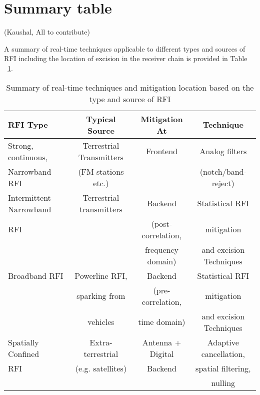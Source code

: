 \section{Summary table} (Kaushal, All to contribute)
\label{section:hardware:summary}

A summary of real-time techniques applicable to different types and sources of RFI including the location of excision in the receiver chain is provided in Table ~\ref{real-time-tech}. \\




\begin{table}
  \begin{center}
  \caption{Summary of real-time techniques and mitigation location based on the type and source of RFI}
  \label{real-time-tech}
 {\scriptsize
  \begin{tabular}{|l|c|c|c|}\hline 
{\bf RFI Type} & {\bf Typical Source} & {\bf Mitigation At} & {\bf Technique} \\ 
    \hline
Strong, continuous,
 & Terrestrial Transmitters & Frontend  & Analog filters\\
  Narrowband RFI  & (FM stations etc.) &  & (notch/band-reject) \\ \hline
  Intermittent Narrowband & Terrestrial transmitters & Backend & Statistical RFI \\
  RFI &  & (post-correlation,
 & mitigation \\ 
&  & frequency domain) & and excision
Techniques \\ \hline
Broadband RFI & Powerline RFI, & Backend & Statistical RFI \\
&  sparking from & (pre-correlation, & mitigation \\ 
&  vehicles & time domain) & and excision Techniques \\ \hline

Spatially Confined & Extra-terrestrial & Antenna + Digital & Adaptive cancellation, \\
RFI & (e.g. satellites) & Backend & spatial filtering, \\
&  &  &  nulling \\ \hline


\end{tabular}}
\end{center}
\end{table}
